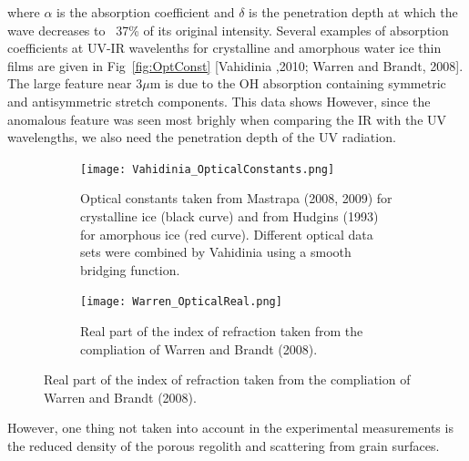 \documentclass[11pt]{article} %
\begin{document}
	where $\alpha$ is the absorption coefficient and $\delta$ is the penetration depth at which the wave decreases to ~37\% of its original intensity. Several examples of absorption coefficients at UV-IR wavelenths for crystalline and amorphous water ice thin films are given in Fig~\ref{fig:OptConst} [Vahidinia ,2010; Warren and Brandt, 2008]. The large feature near 3$\mu$m is due to the OH absorption containing symmetric and antisymmetric stretch components. This data shows  However, since the anomalous feature was seen most brighly when comparing the IR with the UV wavelengths, we also need the penetration depth of the UV radiation.  

	\begin{figure}[hb] \label{fig:OptConst}
	\centering
		\begin{subfigure}[h]{\textwidth}
			\texttt{[image: Vahidinia\_OpticalConstants.png]}
			\caption{Optical constants taken from Mastrapa (2008, 2009) for crystalline ice (black curve) and from Hudgins (1993) for amorphous ice (red curve). Different optical data sets were combined by Vahidinia using a smooth bridging function.}
		\end{subfigure}
		\begin{subfigure}[h]{\textwidth}
			\texttt{[image: Warren\_OpticalReal.png]}
			\caption{Real part of the index of refraction taken from the compliation of Warren and Brandt (2008).}
		\end{subfigure}
	\end{figure}

	However, one thing not taken into account in the experimental measurements is the reduced density of the porous regolith and scattering from grain surfaces. 
	
	
\end{document}
